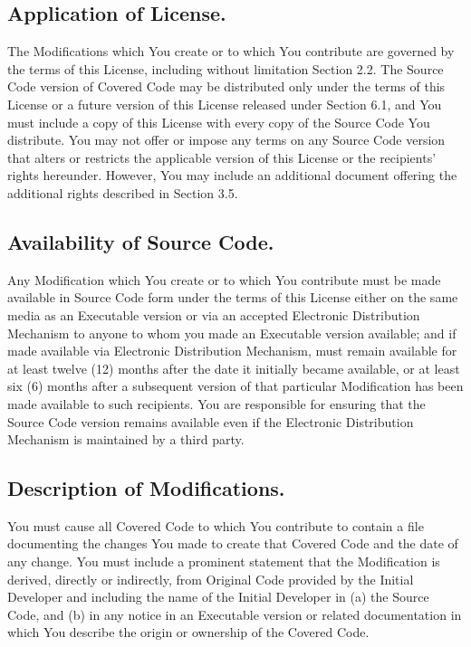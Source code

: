 \documentclass{book}
\begin{document}
\subsection{Application of License.}
The Modifications which You create or to which You contribute are governed by the terms of this License, including without limitation Section 2.2. The Source Code version of Covered Code may be distributed only under the terms of this License or a future version of this License released under Section 6.1, and You must include a copy of this License with every copy of the Source Code You distribute. You may not offer or impose any terms on any Source Code version that alters or restricts the applicable version of this License or the recipients' rights hereunder. However, You may include an additional document offering the additional rights described in Section 3.5. 

\subsection{Availability of Source Code.}
Any Modification which You create or to which You contribute must be made available in Source Code form under the terms of this License either on the same media as an Executable version or via an accepted Electronic Distribution Mechanism to anyone to whom you made an Executable version available; and if made available via Electronic Distribution Mechanism, must remain available for at least twelve (12) months after the date it initially became available, or at least six (6) months after a subsequent version of that particular Modification has been made available to such recipients. You are responsible for ensuring that the Source Code version remains available even if the Electronic Distribution Mechanism is maintained by a third party. 

\subsection{Description of Modifications.}
You must cause all Covered Code to which You contribute to contain a file documenting the changes You made to create that Covered Code and the date of any change. You must include a prominent statement that the Modification is derived, directly or indirectly, from Original Code provided by the Initial Developer and including the name of the Initial Developer in (a) the Source Code, and (b) in any notice in an Executable version or related documentation in which You describe the origin or ownership of the Covered Code. 
\end{document}
